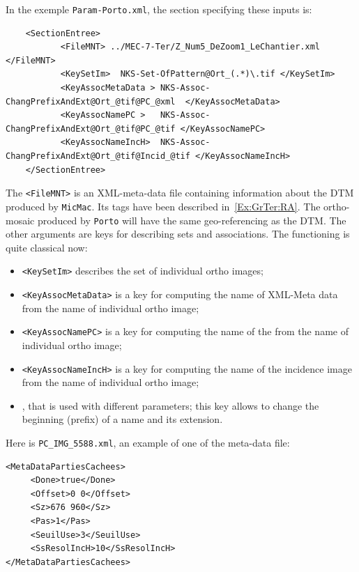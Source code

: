 In the exemple {\tt Param-Porto.xml}, the section specifying these inputs is:


{\scriptsize
\begin{verbatim}
    <SectionEntree>
           <FileMNT> ../MEC-7-Ter/Z_Num5_DeZoom1_LeChantier.xml </FileMNT>
           <KeySetIm>  NKS-Set-OfPattern@Ort_(.*)\.tif </KeySetIm>
           <KeyAssocMetaData > NKS-Assoc-ChangPrefixAndExt@Ort_@tif@PC_@xml  </KeyAssocMetaData>
           <KeyAssocNamePC >   NKS-Assoc-ChangPrefixAndExt@Ort_@tif@PC_@tif </KeyAssocNamePC>
           <KeyAssocNameIncH>  NKS-Assoc-ChangPrefixAndExt@Ort_@tif@Incid_@tif </KeyAssocNameIncH>
    </SectionEntree>
\end{verbatim}
}

The {\tt <FileMNT>} is an XML-meta-data file containing information about the DTM produced
by {\tt MicMac}. Its tags have been described in~\ref{Ex:GrTer:RA}. The ortho-mosaic produced
by {\tt Porto} will have the same geo-referencing as the DTM. The other arguments are
keys for describing sets and associations. The functioning is quite classical now:

\begin{itemize}
    \item {\tt <KeySetIm>} describes the set of individual ortho images;
    \item {\tt <KeyAssocMetaData>} is a key for computing the name of XML-Meta data from the name of individual ortho image;
    \item {\tt <KeyAssocNamePC>} is a key for computing the name of the  from the name of individual ortho image;
    \item {\tt <KeyAssocNameIncH>} is a key for computing the name of the incidence image from the name of individual ortho image;

    \item {}, that is used with different parameters; this key allows to change the
          beginning (prefix) of a name and its extension.

\end{itemize}

Here is {\tt PC\_IMG\_5588.xml}, an example of one of the meta-data file:


{\scriptsize
\begin{verbatim}
<MetaDataPartiesCachees>
     <Done>true</Done>
     <Offset>0 0</Offset>
     <Sz>676 960</Sz>
     <Pas>1</Pas>
     <SeuilUse>3</SeuilUse>
     <SsResolIncH>10</SsResolIncH>
</MetaDataPartiesCachees>
\end{verbatim}
}

